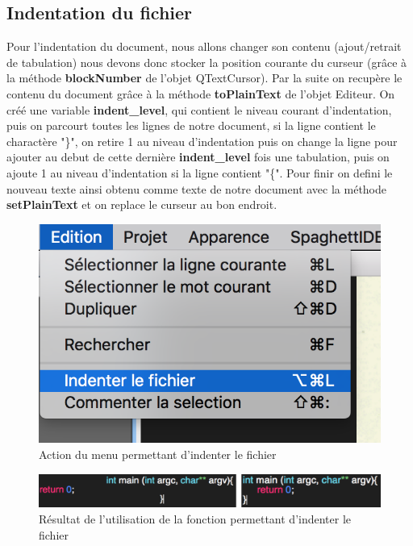 \documentclass[a4paper,12pt]{article}
\begin{document}
\subsection{Indentation du fichier}

	Pour l'indentation du document, nous allons changer son contenu (ajout/retrait de tabulation) nous devons donc stocker la position courante du curseur (grâce à la méthode \textbf{blockNumber} de l'objet QTextCursor). Par la suite on recupère le contenu du document grâce à la méthode \textbf{toPlainText} de l'objet Editeur. On créé une variable \textbf{indent\_level}, qui contient le niveau courant d'indentation, puis on parcourt toutes les lignes de notre document, si la ligne contient le charactère "\}", on retire 1 au niveau d'indentation puis on change la ligne pour ajouter au debut de cette dernière \textbf{indent\_level} fois une tabulation, puis on ajoute 1 au niveau d'indentation si la ligne contient "\{".
	Pour finir on defini le nouveau texte ainsi obtenu comme texte de notre document avec la méthode \textbf{setPlainText} et on replace le curseur au bon endroit.

	\begin{figure}[h!]

		\begin{center}
			\includegraphics[scale=0.8]{images/imgs_edit/utilisation_indentation}
			\caption{Action du menu permettant d'indenter le fichier}
		\end{center}
	\end{figure}

	\begin{figure}[h!]
		\begin{center}
			\includegraphics[scale=0.8]{images/imgs_edit/resultat_indentation}
			\caption{Résultat de l'utilisation de la fonction permettant d'indenter le fichier}
		\end{center}
	\end{figure}
\end{document}
